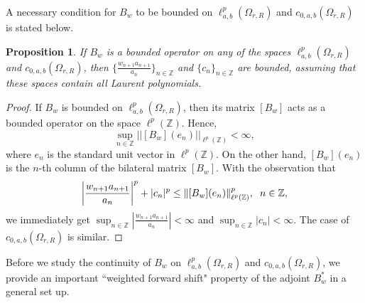 \documentclass[12pt, reqno]{amsart}
\newtheorem{proposition}[theorem]{Proposition}
\theoremstyle{definition}
\theoremstyle{remark}
\numberwithin{equation}{section}
\begin{document}
 A necessary condition for $B_w$ to be bounded on $\ell^p_{a,b}(\Omega_{r,R})$ and $c_{0,a,b}(\Omega_{r,R})$ is stated below.

 \begin{proposition}
     If $B_w$ is a bounded operator on any of the spaces $\ell^p_{a,b}(\Omega_{r,R})$ and $c_{0,a,b}(\Omega_{r,R})$, then $\{\frac{ w_{n+1}a_{n+1}}{a_{n}}\}_{n\in\mathbb{Z}}$ and $\{c_{n}\}_{n\in\mathbb{Z}}$ are bounded, assuming that these spaces contain all Laurent polynomials.
 \end{proposition}
 \begin{proof}
     If $B_w$ is bounded on $\ell^p_{a,b}(\Omega_{r,R})$, then its matrix $[B_w]$ acts as a bounded operator on the space $\ell^p(\mathbb{Z})$.
     Hence, 
     \[
     \sup_{n\in \mathbb{Z}}||[B_w](e_n)||_{\ell^p(\mathbb{Z})}<\infty,
     \]
     where $e_n$ is the standard unit vector in $\ell^p(\mathbb{Z})$. On the other hand, $[B_w](e_n)$ is the $n$-th column of the bilateral matrix $[B_w]$. With the observation that
     \[
     \left|\frac{ w_{n+1}a_{n+1}}{a_{n}}\right|^{p}+|c_{n}|^{p}\leq \|[B_w](e_n)\|_{\ell^p(\mathbb{Z})}^{p}, \hskip .2cm n\in \mathbb{Z},
     \]
     we immediately get $\sup_{n\in \mathbb{Z}}|\frac{ w_{n+1}a_{n+1}}{a_{n}}|<\infty$ and $\sup_{n\in\mathbb{Z}}|c_{n}|<\infty.$ The case of $c_{0,a,b}(\Omega_{r,R})$ is similar.
 \end{proof}


Before we study the continuity of $B_w$ on $\ell^{p}_{a,b}(\Omega_{r,R})$ and $c_{0,a,b}(\Omega_{r,R})$, we provide an important ``weighted forward shift" property of the adjoint $B_w^*$ in a general set up.
\end{document}
